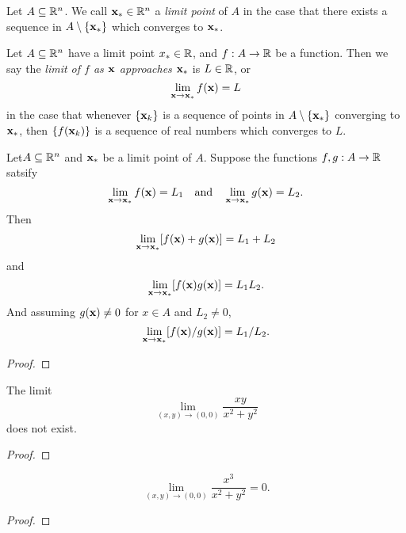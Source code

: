 \documentclass[letterpaper, twoside, 12pt]{book}
\begin{document}
\begin{definition}
  Let \(A\subseteq\mathbb R^n\). We call \(\mathbf x_*\in\mathbb R^n\) a
  \textit{limit point} of \(A\) in the case that there exists a sequence
  in \(A\setminus\{\mathbf x_*\}\) which converges to \(\mathbf x_*\).
\end{definition}

\begin{definition}
  Let \(A\subseteq\mathbb R^n\) have a limit point \(x_*\in\mathbb R\), and
  \(f:A\to\mathbb R\) be a function. Then we say the
  \textit{limit of \(f\) as \(\mathbf x\) approaches \(\mathbf x_*\)}
  is \(L\in\mathbb R\), or
  \[
    \lim_{\mathbf x\to\mathbf x_*} f(\mathbf x)
      =
    L
  \]
  in the case that whenever \(\{\mathbf x_k\}\) is a sequence of points in
  \(A\setminus\{\mathbf x_*\}\) converging to \(\mathbf x_*\),
  then \(\{f(\mathbf x_k)\}\) is a sequence of real numbers which
  converges to \(L\).
\end{definition}

\begin{theorem}[13.3]
  Let\(A\subseteq\mathbb R^n\) and \(\mathbf x_*\) be a limit point of \(A\).
  Suppose the functions \(f,g:A\to\mathbb R\) satsify
  \[
    \lim_{\mathbf x\to\mathbf x_*} f(\mathbf x)
      =
    L_1
    ~~~\text{and}~~~
    \lim_{\mathbf x\to\mathbf x_*} g(\mathbf x)
      =
    L_2
  .\]
  Then
  \[
    \lim_{\mathbf x\to\mathbf x_*} [f(\mathbf x)+g(\mathbf x)]
      =
    L_1+L_2
  \]
  and
  \[
    \lim_{\mathbf x\to\mathbf x_*} [f(\mathbf x)g(\mathbf x)]
      =
    L_1L_2
  .\]
  And assuming \(g(\mathbf x)\not=0\) for \(x\in A\) and \(L_2\not=0\),
  \[
    \lim_{\mathbf x\to\mathbf x_*} [f(\mathbf x)/g(\mathbf x)]
      =
    L_1/L_2
  .\]
\end{theorem}
\begin{proof}

\end{proof}

\begin{example}[13.4]
  The limit
  \[
    \lim_{(x,y)\to(0,0)}\frac{xy}{x^2+y^2}
  \]
  does not exist.
\end{example}
\begin{proof}

\end{proof}

\begin{example}[13.5]
  \[
    \lim_{(x,y)\to(0,0)}\frac{x^3}{x^2+y^2}
      =
    0
  .\]
\end{example}
\begin{proof}

\end{proof}
\end{document}
